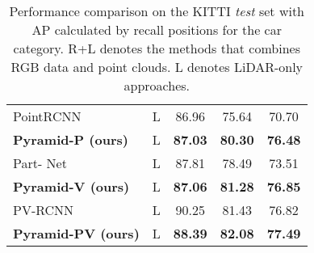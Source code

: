 \documentclass[10pt,twocolumn,letterpaper]{article}
\begin{document}
\begin{table}[]
{\begin{tabular}{|l|c| c c c|}
\midrule
PointRCNN~\cite{shi2019pointrcnn}   & L             & 86.96  & 75.64  & 70.70  \\
\textbf{Pyramid-P (ours)}    & L         & \textbf{87.03} & \textbf{80.30} & \textbf{76.48}  \\
\midrule
Part- Net~\cite{shi2020points} & L           & 87.81  & 78.49  & 73.51  \\
\textbf{Pyramid-V (ours)}       & L & \textbf{87.06}  & \textbf{81.28} & \textbf{76.85}\\
\midrule
PV-RCNN~\cite{shi2020pv}        & L                 & 90.25  & 81.43  & 76.82  \\
\textbf{Pyramid-PV (ours)}      & L & \textbf{88.39}  & \textbf{82.08}  & \textbf{77.49} \\ 
\bottomrule
\end{tabular}}
\setlength{\belowcaptionskip}{10pt}
\caption{Performance comparison on the KITTI \textit{test} set with AP calculated by  recall positions for the car category. R+L denotes the methods that combines RGB data and point clouds. L denotes LiDAR-only approaches.} \label{table_kitti_1}
\vspace{-3mm}
\end{table}

\begin{table}[]
\setlength{\belowcaptionskip}{10pt}
\caption{Performance comparison on the KITTI \textit{val} split with AP calculated by  recall positions for the car category.} \label{table_kitti_2}
\vspace{-3mm}
\end{table}
\end{document}
